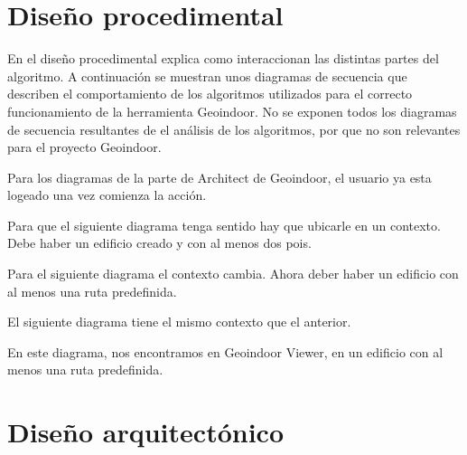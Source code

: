 \section{Diseño procedimental}

En el diseño procedimental explica como interaccionan las distintas partes del algoritmo.
A continuación se muestran unos diagramas de secuencia que describen el comportamiento de los algoritmos utilizados para el correcto funcionamiento de la herramienta Geoindoor. No se exponen todos los diagramas de secuencia resultantes de el análisis de los algoritmos, por que no son relevantes para el proyecto Geoindoor.

Para los diagramas de la parte de Architect de Geoindoor, el usuario ya esta logeado una vez comienza la acción.
\newpage
{}

Para que el siguiente diagrama tenga sentido hay que ubicarle en un contexto. Debe haber un edificio creado y con al menos dos pois.
\newpage
{}

Para el siguiente diagrama el contexto cambia. Ahora deber haber un edificio con al menos una ruta predefinida.


\newpage
El siguiente diagrama tiene el mismo contexto que el anterior.


\newpage
En este diagrama, nos encontramos en Geoindoor Viewer, en un edificio con al menos una ruta predefinida.

 
\section{Diseño arquitectónico}


